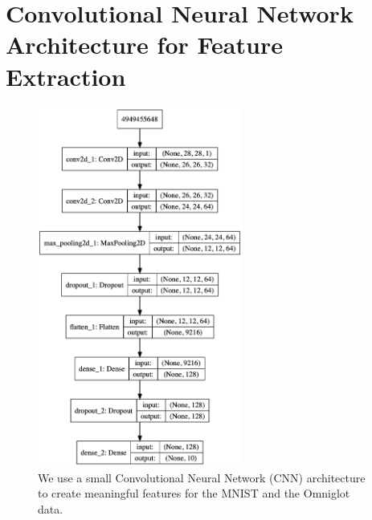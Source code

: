 \chapter{Convolutional Neural Network Architecture for Feature Extraction}
\label{sec:cnnarchitecture}

\begin{figure}[H]
    \centering
    \includegraphics[width=0.6\textwidth]{images/model}
    \caption{We use a small Convolutional Neural Network (CNN) architecture to create meaningful features for the MNIST and the Omniglot data.}
    \label{fig:model}
\end{figure}